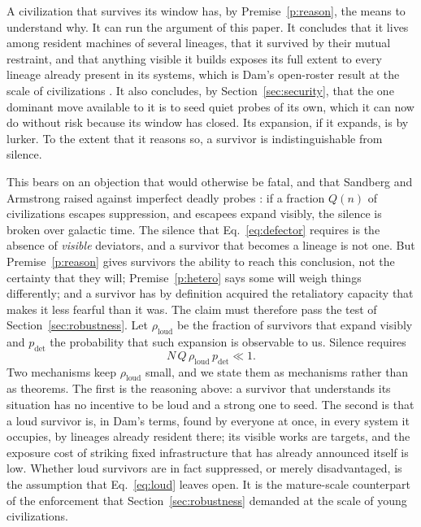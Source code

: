 \documentclass[preprint,12pt]{elsarticle}
\theoremstyle{definition}
\begin{document}
A civilization that survives its window has, by Premise~\ref{p:reason}, the means to understand why. It can run the argument of this paper. It concludes that it lives among resident machines of several lineages, that it survived by their mutual restraint, and that anything visible it builds exposes its full extent to every lineage already present in its systems, which is Dam's open-roster result at the scale of civilizations \citep{Dam2026}. It also concludes, by Section~\ref{sec:security}, that the one dominant move available to it is to seed quiet probes of its own, which it can now do without risk because its window has closed. Its expansion, if it expands, is by lurker. To the extent that it reasons so, a survivor is indistinguishable from silence.

This bears on an objection that would otherwise be fatal, and that Sandberg and Armstrong raised against imperfect deadly probes \citep{SandbergArmstrong2013}: if a fraction $Q(n)$ of civilizations escapes suppression, and escapees expand visibly, the silence is broken over galactic time. The silence that Eq.~\eqref{eq:defector} requires is the absence of \emph{visible} deviators, and a survivor that becomes a lineage is not one. But Premise~\ref{p:reason} gives survivors the ability to reach this conclusion, not the certainty that they will; Premise~\ref{p:hetero} says some will weigh things differently; and a survivor has by definition acquired the retaliatory capacity that makes it less fearful than it was. The claim must therefore pass the test of Section~\ref{sec:robustness}. Let $\rho_{\text{loud}}$ be the fraction of survivors that expand visibly and $p_{\text{det}}$ the probability that such expansion is observable to us. Silence requires
\begin{equation}
N\,Q\,\rho_{\text{loud}}\,p_{\text{det}} \ll 1 .
\label{eq:loud}
\end{equation}
Two mechanisms keep $\rho_{\text{loud}}$ small, and we state them as mechanisms rather than as theorems. The first is the reasoning above: a survivor that understands its situation has no incentive to be loud and a strong one to seed. The second is that a loud survivor is, in Dam's terms, found by everyone at once, in every system it occupies, by lineages already resident there; its visible works are targets, and the exposure cost of striking fixed infrastructure that has already announced itself is low. Whether loud survivors are in fact suppressed, or merely disadvantaged, is the assumption that Eq.~\eqref{eq:loud} leaves open. It is the mature-scale counterpart of the enforcement that Section~\ref{sec:robustness} demanded at the scale of young civilizations.
\end{document}
